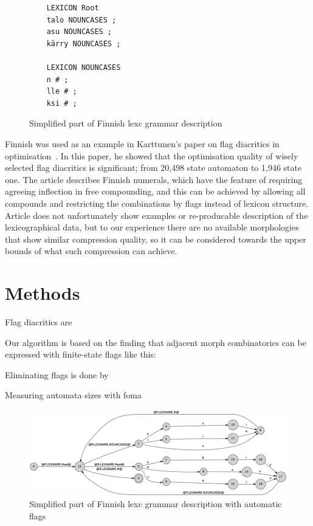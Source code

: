 \documentclass[11pt]{article}
\begin{document}
\begin{figure}
    \centering
    \begin{verbatim}
    LEXICON Root
    talo NOUNCASES ;
    asu NOUNCASES ;
    kärry NOUNCASES ;

    LEXICON NOUNCASES
    n # ;
    lle # ;
    ksi # ;
    \end{verbatim}
    \caption{Simplified part of Finnish lexc grammar description
    \label{fig:lexc-fin}}
\end{figure}

Finnish was used as an example in Karttunen's paper on flag diacritics in
optimisation~. In this paper, he showed that
the optimisation quality of wisely selected flag diacritics is significant;
from 20,498 state automaton to 1,946 state one. The article describes Finnish
numerals, which have the feature of requiring agreeing inflection in free
compounding, and this can be achieved by allowing all compounds and restricting
the combinations by flags instead of lexicon structure. Article does not
unfortunately show examples or re-producable description of the lexicographical
data, but to our experience there are no available morphologies that show
similar compression quality, so it can be considered towards the upper bounds
of what such compression can achieve.
 

\section{Methods}
\label{sec:methods}

Flag diacritics are

Our algorithm is based on the finding that adjacent morph combinatorics can
be expressed with finite-state flags like this:

Eliminating flags is done by

Measuring automata sizes with foma

\begin{figure}
    \includegraphics[width=\textwidth]{transducer.png}
     \caption{Simplified part of Finnish lexc grammar description with automatic flags
     \label{fig:lexc-fin-flag}}
\end{figure}
\end{document}
